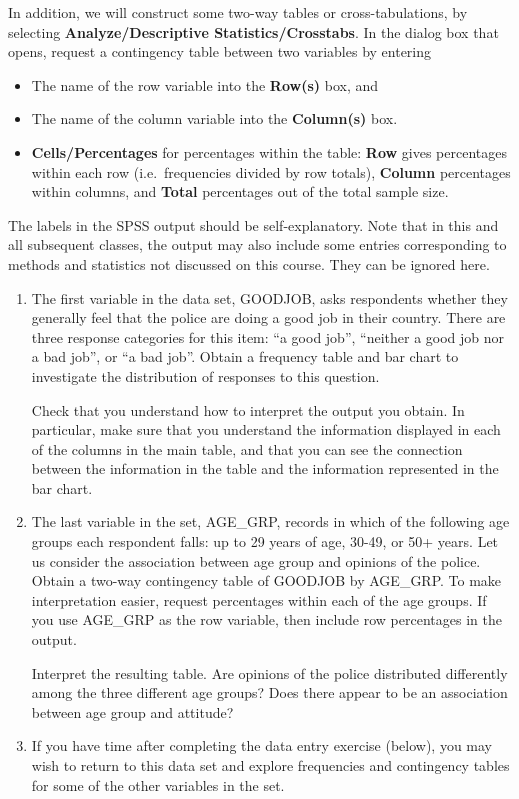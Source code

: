 \documentclass[11pt,a4paper,openany]{book}
\begin{document}
In addition, we will construct some two-way tables or cross-tabulations,
by selecting \textbf{Analyze/Descriptive Statistics/Crosstabs}. In the
dialog box that opens, request a contingency table between two variables
by entering

\begin{itemize}
\item
  The name of the row variable into the \textbf{Row(s)} box, and
\item
  The name of the column variable into the \textbf{Column(s)} box.
\item
  \textbf{Cells/Percentages} for percentages within the table:
  \textbf{Row} gives percentages within each row (i.e.~frequencies
  divided by row totals), \textbf{Column} percentages within columns,
  and \textbf{Total} percentages out of the total sample size.
\end{itemize}

The labels in the SPSS output should be self-explanatory. Note that in
this and all subsequent classes, the output may also include some
entries corresponding to methods and statistics not discussed on this
course. They can be ignored here.

\begin{enumerate}
\def\labelenumi{\arabic{enumi}.}
\item
  The first variable in the data set, GOODJOB, asks respondents whether
  they generally feel that the police are doing a good job in their
  country. There are three response categories for this item: ``a good
  job'', ``neither a good job nor a bad job'', or ``a bad job''. Obtain
  a frequency table and bar chart to investigate the distribution of
  responses to this question.

  Check that you understand how to interpret the output you obtain. In
  particular, make sure that you understand the information displayed in
  each of the columns in the main table, and that you can see the
  connection between the information in the table and the information
  represented in the bar chart.
\item
  The last variable in the set, AGE\_GRP, records in which of the
  following age groups each respondent falls: up to 29 years of age,
  30-49, or 50+ years. Let us consider the association between age group
  and opinions of the police. Obtain a two-way contingency table of
  GOODJOB by AGE\_GRP. To make interpretation easier, request
  percentages within each of the age groups. If you use AGE\_GRP as the
  row variable, then include row percentages in the output.

  Interpret the resulting table. Are opinions of the police distributed
  differently among the three different age groups? Does there appear to
  be an association between age group and attitude?
\item
  If you have time after completing the data entry exercise (below), you
  may wish to return to this data set and explore frequencies and
  contingency tables for some of the other variables in the set.
\end{enumerate}
\end{document}
